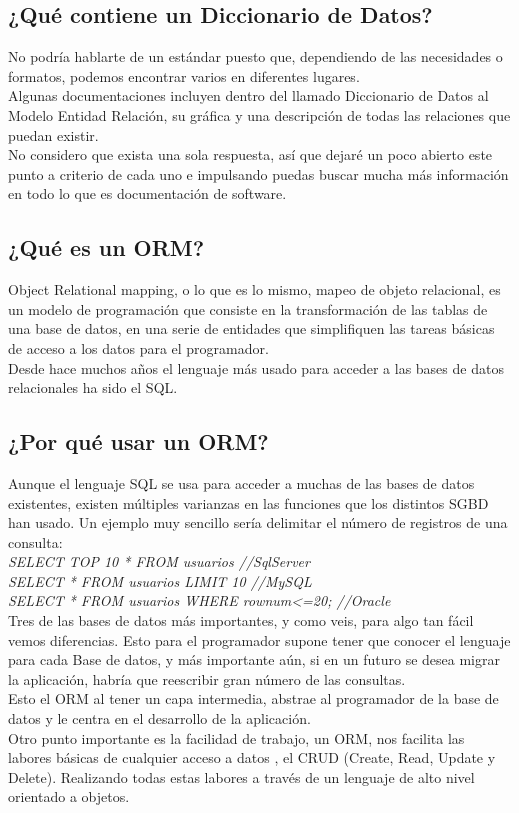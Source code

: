 \documentclass[12pt,letterpaper]{article}
\begin{document}
    \subsection{¿Qué contiene un Diccionario de Datos?}
    No podría hablarte de un estándar puesto que, dependiendo de las necesidades o formatos, podemos encontrar varios en diferentes lugares.\\
    Algunas documentaciones incluyen dentro del llamado Diccionario de Datos al Modelo Entidad Relación, su gráfica y una descripción de todas las relaciones que puedan existir.\\
    No considero que exista una sola respuesta, así que dejaré un poco abierto este punto a criterio de cada uno e impulsando puedas buscar mucha más información en todo lo que es documentación de software.\\
    
    \subsection{¿Qué es un ORM?}
    Object Relational mapping, o lo que es lo mismo, mapeo de objeto relacional, es un modelo de programación que consiste en la transformación de las tablas de una base de datos, en una serie de entidades que simplifiquen las tareas básicas de acceso a los datos para el programador.\\
    Desde hace muchos años el lenguaje más usado para acceder a las bases de datos relacionales ha sido el SQL. \\
    
    \subsection{¿Por qué usar un ORM?}
    Aunque el lenguaje SQL se usa para acceder a muchas de las bases de datos existentes, existen múltiples varianzas en las funciones que los distintos SGBD han usado. Un ejemplo muy sencillo sería delimitar el número de registros de una consulta:\\

    \textit{SELECT TOP 10 * FROM usuarios //SqlServer}\\
    \textit{SELECT * FROM usuarios LIMIT 10 //MySQL}\\
    \textit{SELECT * FROM usuarios WHERE rownum<=20; //Oracle}\\
    
    Tres de las bases de datos más importantes, y como veis, para algo tan fácil vemos diferencias. Esto para el programador supone tener que conocer el lenguaje para cada Base de datos, y más importante aún, si en un futuro se desea migrar la aplicación, habría que reescribir gran número de las consultas.\\
    Esto el ORM al tener un capa intermedia, abstrae al programador de la base de datos y le centra en el desarrollo de la aplicación.\\
    Otro punto importante es la facilidad de trabajo, un ORM, nos facilita las labores básicas de cualquier acceso a datos , el CRUD (Create, Read, Update y Delete). Realizando todas estas labores a través de un lenguaje de alto nivel orientado a objetos. \\
    
\end{document}
